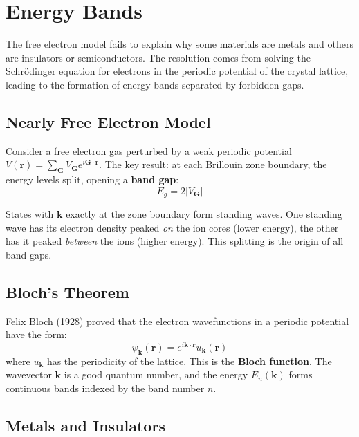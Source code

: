 \chapter{Energy Bands}

The free electron model fails to explain why some materials are metals and others are insulators or semiconductors. The resolution comes from solving the Schr\"odinger equation for electrons in the periodic potential of the crystal lattice, leading to the formation of energy bands separated by forbidden gaps.

\section{Nearly Free Electron Model}

Consider a free electron gas perturbed by a weak periodic potential $V(\mathbf{r}) = \sum_\mathbf{G} V_\mathbf{G} e^{i\mathbf{G}\cdot\mathbf{r}}$. The key result: at each Brillouin zone boundary, the energy levels split, opening a \textbf{band gap}:
\begin{equation}
  E_g = 2|V_\mathbf{G}|
\end{equation}

States with $\mathbf{k}$ exactly at the zone boundary form standing waves. One standing wave has its electron density peaked \textit{on} the ion cores (lower energy), the other has it peaked \textit{between} the ions (higher energy). This splitting is the origin of all band gaps.

\section{Bloch's Theorem}

Felix Bloch (1928) proved that the electron wavefunctions in a periodic potential have the form:
\begin{equation}
  \psi_{\mathbf{k}}(\mathbf{r}) = e^{i\mathbf{k}\cdot\mathbf{r}} u_{\mathbf{k}}(\mathbf{r})
\end{equation}
where $u_\mathbf{k}$ has the periodicity of the lattice. This is the \textbf{Bloch function}. The wavevector $\mathbf{k}$ is a good quantum number, and the energy $E_n(\mathbf{k})$ forms continuous bands indexed by the band number $n$.

\section{Metals and Insulators}

